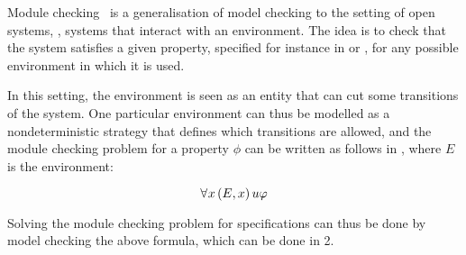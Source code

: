 Module checking~\cite{kupferman2001module} is a generalisation of model checking to the setting
of open systems, \ie, systems that interact with an environment. The
idea is to check that the system satisfies a given property, specified
for instance in \LTL or \CTLs, for any possible environment in which
it is used.

In this setting, the environment is seen as an entity that can cut
some transitions of the system. One particular environment can thus be
modelled as a nondeterministic strategy that defines which transitions
are allowed, and the module checking problem for a property $\phi$ can
be written as follows in \SLref, where $E$ is the environment:

\[\forall^{} x\, (E,x) \,u\varphi\]

Solving the module checking problem for \CTLs specifications can thus
be done by model checking the above \SLref formula, which can be done
in 2\EXPTIME.

